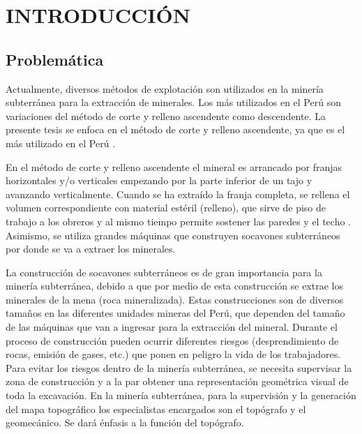 \chapter{INTRODUCCIÓN}

\section{Problemática}

Actualmente, diversos métodos de explotación son utilizados en la minería 
subterránea para la extracción de minerales. Los más utilizados en el Perú 
son variaciones del método de corte y relleno ascendente como descendente. La 
presente tesis se enfoca en el método de corte y relleno ascendente, ya que es el 
más utilizado en el Perú \cite{Cruz2012}. 

En el método de corte y relleno ascendente el mineral es arrancado por franjas 
horizontales y/o verticales empezando por la parte inferior de un tajo y avanzando 
verticalmente. Cuando se ha extraído la franja completa, se rellena el volumen 
correspondiente con material estéril (relleno), que sirve de piso de trabajo a 
los obreros y al mismo tiempo permite sostener las paredes y el 
techo \cite{MunozDelPino2012}. Asimismo, se utiliza grandes máquinas que construyen 
socavones subterráneos por donde se va a extraer los minerales. 

La construcción de socavones subterráneos es de gran importancia para la minería 
subterránea, debido a que por medio de esta construcción se extrae los minerales 
de la mena (roca mineralizada). Estas construcciones son de diversos tamaños  en 
las diferentes unidades mineras del Perú, que dependen del tamaño de las máquinas
que van a ingresar para la extracción del mineral. Durante el proceso de construcción
pueden ocurrir diferentes riesgos (desprendimiento de rocas, emisión de gases, etc.) 
que ponen en peligro la vida de los trabajadores. Para evitar los riesgos dentro de 
la minería subterránea, se necesita supervisar la zona de construcción y a la par 
obtener una representación geométrica visual de toda la excavación. En la minería 
subterránea, para la supervisión y la generación del mapa topográfico los 
especialistas encargados son el topógrafo y el geomecánico. Se dará énfasis a 
la función del topógrafo. 

